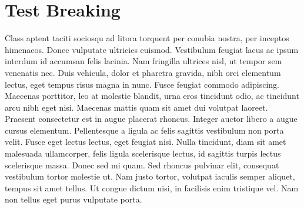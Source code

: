\section{Test Breaking}

Class aptent taciti sociosqu ad litora torquent per conubia nostra, per inceptos himenaeos. Donec vulputate ultricies euismod. Vestibulum feugiat lacus ac ipsum interdum id accumsan felis lacinia. Nam fringilla ultrices nisl, ut tempor sem venenatis nec. Duis vehicula, dolor et pharetra gravida, nibh orci elementum lectus, eget tempus risus magna in nunc. Fusce feugiat commodo adipiscing. Maecenas porttitor, leo at molestie blandit, urna eros tincidunt odio, ac tincidunt arcu nibh eget nisi. Maecenas mattis quam sit amet dui volutpat laoreet. Praesent consectetur est in augue placerat rhoncus. Integer auctor libero a augue cursus elementum. Pellentesque a ligula ac felis sagittis vestibulum non porta velit. Fusce eget lectus lectus, eget feugiat nisi. Nulla tincidunt, diam sit amet malesuada ullamcorper, felis ligula scelerisque lectus, id sagittis turpis lectus scelerisque massa. Donec sed mi quam. Sed rhoncus pulvinar elit, consequat vestibulum tortor molestie ut. Nam justo tortor, volutpat iaculis semper aliquet, tempus sit amet tellus. Ut congue dictum nisi, in facilisis enim tristique vel. Nam non tellus eget purus vulputate porta.

